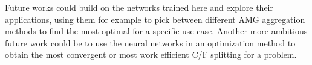 \documentclass{siamart190516}
\begin{document}
Future works could build on the networks trained here and explore their applications, using them for example to pick between different AMG aggregation methods to find the most optimal for a specific use case.  Another more ambitious future work could be to use the neural networks in an optimization method to obtain the most convergent or most work efficient C/F splitting for a problem.



\end{document}
